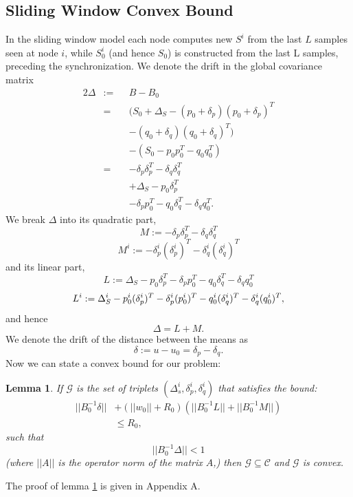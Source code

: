 \documentclass{sig-alternate-05-2015}
\newtheorem{lemma}{Lemma}
\begin{document}
\subsection{Sliding Window Convex Bound}
In the sliding window model each node computes new $S^i$ from the last $L$ samples seen
at node $i$, while $S_0^i$ (and hence $S_0$) is constructed from the last L samples, preceding
the synchronization.
We denote the drift in the global covariance matrix
\begin{alignat*}{2}
\Delta & := && B-B_0 \\
& = && (S_0+\Delta_S - (p_0+\delta_p)(p_0+\delta_p)^T \\
& && - (q_0+\delta_q)(q_0+\delta_q)^T) \\
& && - (S_0 - p_0p_0^T - q_0q_0^T) \\
& = && - \delta_p\delta_p^T - \delta_q\delta_q^T \\
& && + \Delta_S - p_0\delta_p^T \\
& && - \delta_pp_0^T - q_0\delta_q^T - \delta_qq_0^T.
\end{alignat*}
We break $\Delta$ into its quadratic part,
\begin{equation*}
M:= - \delta_p\delta_p^T - \delta_q\delta_q^T
\end{equation*}
\begin{equation*}
M^i:= - \delta_p^i(\delta_p^i)^T - \delta_q^i(\delta_q^i)^T
\end{equation*}
and its linear part,
\begin{equation*}
L:= \Delta_S - p_0\delta_p^T - \delta_pp_0^T - q_0\delta_q^T - \delta_qq_0^T
\end{equation*}
\begin{equation*}
\\ L^i := \Delta_S^i - p_0^i(\delta_p^i)^T - \delta_p^i(p_0^i)^T -
q_0^i(\delta_q^i)^T - \delta_q^i(q_0^i)^T,
\end{equation*}
and hence
\begin{equation*}
\Delta= L+ M.
\end{equation*}
We denote the drift of the distance between the means as
\begin{equation*}
\delta:= u-u_0 = \delta_p - \delta_q.
\end{equation*}
Now we can state a convex bound for our problem:
\begin{lemma} \label{convexBound}
If $\mathcal{G}$ is the set of triplets $(\Delta_s^i, \delta_p^i, \delta_q^i)$
 that satisfies the bound:
 \begin{equation} \label{eq:convexBound}
\begin{split}
||B_0^{-1}\delta|| &+ (||w_0||+R_0)(||B_0^{-1}L||+||B_0^{-1}M||) \\ & \leq  R_0,
\end{split}
\end{equation}
such that
 \begin{equation*}
||B_0^{-1}\Delta|| < 1
\end{equation*}
 (where $||A||$ is the operator norm of the matrix $A$,) then $\mathcal{G}\subseteq \mathcal{C}$ and $\mathcal{G}$ is convex.
\end{lemma}
The proof of lemma \ref{convexBound} is given in Appendix A.
\end{document}
